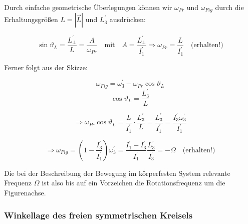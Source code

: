\documentclass[10pt, letterpaper]{article}
\begin{document}
Durch einfache geometrische Überlegungen können wir $\omega_{Pr}$ und $\omega_{Fig}$ durch die Erhaltungsgrößen $L=|\vec{L}|$ und $L_3^\prime$ ausdrücken:


\[\sin \vartheta_L = \frac{L_\perp^\prime}{L} = \frac{A}{\omega_{Pr}} \quad \text{mit} \quad A = \frac{L_\perp^\prime}{I_1^\prime} \Rightarrow \omega_{Pr} = \frac{L}{I_1^\prime} \quad \text{(erhalten!)}\]

Ferner folgt aus der Skizze:

\[\omega_{Fig} = \omega_3^\prime - \omega_{Pr} \cos \vartheta_L\]
\[\cos \vartheta_L = \frac{L_3^\prime}{L}\]

\[\Rightarrow \omega_{Pr} \cos \vartheta_L = \frac{L}{I_1^\prime} \cdot \frac{L_3^\prime}{L} = \frac{L_3^\prime}{I_1^\prime} = \frac{I_3^\prime\omega_3^\prime}{I_1^\prime}\]

\[\Rightarrow \omega_{Fig} = (1-\frac{I_3^\prime}{I_1^\prime})\omega_3^\prime = \frac{I_1^\prime-I_3^\prime}{I_1^\prime}\frac{L_3^\prime}{I_3^\prime} = -\Omega \quad \text{(erhalten!)}\]

Die bei der Beschreibung der Bewegung im körperfesten System relevante Frequenz $\Omega$ ist also bis auf ein Vorzeichen die Rotationsfrequenz um die Figurenachse.



\subsubsection*{Winkellage des freien symmetrischen Kreisels}
\end{document}
